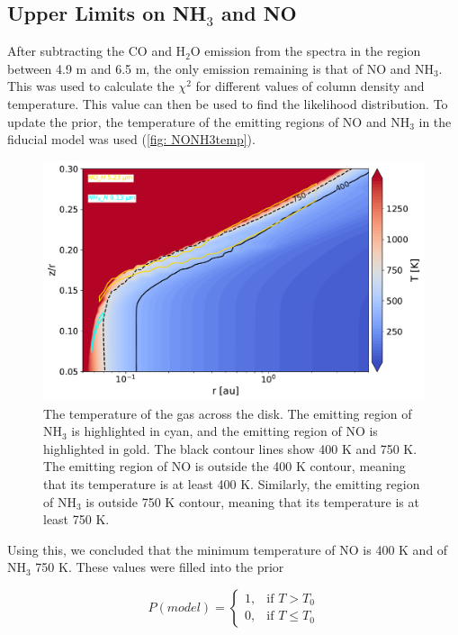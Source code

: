 \documentclass[oneside, single, authoryear, semicolon, 12pt]{lion-msc}
\newcommand{\4}{$_4$}
\newcommand{\3}{$_3$}
\newcommand{\2}{$_2$}
\begin{document}
\subsection{Upper Limits on NH\3 and NO}
After subtracting the CO and H\2O emission from the spectra in the region between 4.9 \textmu m and 6.5 \textmu m, the only emission remaining is that of NO and NH\3. This was used to calculate the $\chi^2$ for different values of column density and temperature. This value can then be used to find the likelihood distribution. To update the prior, the temperature of the emitting regions of NO and NH\3 in the fiducial model was used (\autoref{fig: NONH3temp}).

\begin{figure}[H]
    \centering
    \includegraphics[width=\linewidth]{Figures/NONH3temp.pdf}
    \caption{The temperature of the gas across the disk. The emitting region of NH\3 is highlighted in cyan, and the emitting region of NO is highlighted in gold. The black contour lines show 400 K and 750 K. The emitting region of NO is outside the 400 K contour, meaning that its temperature is at least 400 K. Similarly, the emitting region of NH\3 is outside 750 K contour, meaning that its temperature is at least 750 K.}
    \label{fig: NONH3temp}
\end{figure}

Using this, we concluded that the minimum temperature of NO is 400 K and of NH\3 750 K. These values were filled into the prior

\begin{equation}
    P(model) = 
    \begin{cases}
        1, & \text{if } T > T_0 \\
        0, & \text{if } T \leq T_0
    \end{cases}
\end{equation}
\end{document}
